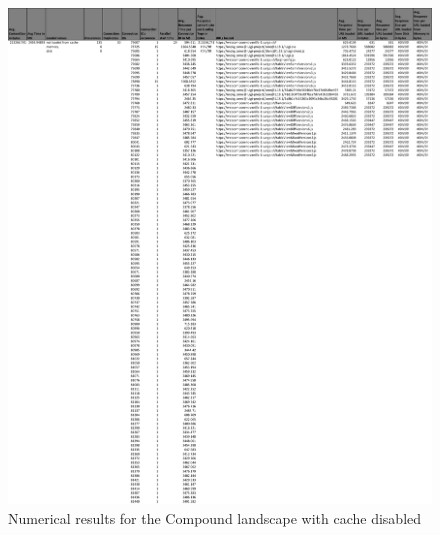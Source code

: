\begin{figure}[!h]
	\centering
	\begin{adjustbox}{width=\textwidth,totalheight=0.9\textheight}
		\includegraphics[angle=90]{Figures/compound_allhar.pdf}
	\end{adjustbox}
	\caption{Numerical results for the Compound landscape with cache disabled}
	\label{fig:appendix_1_21}
\end{figure}
\newpage
